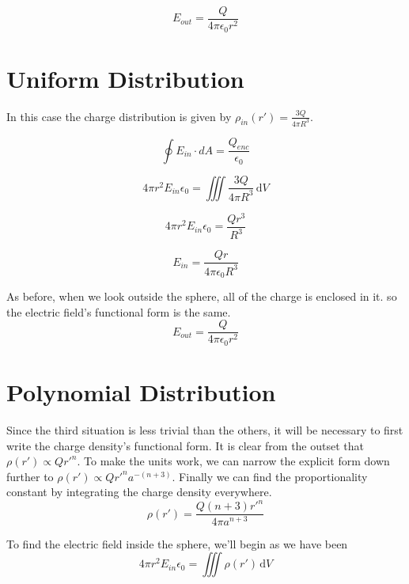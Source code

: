 \documentclass[10pt,a4paper]{article}
\begin{document}
\begin{equation}\boxed{
E_{out} = \frac{Q}{4\pi\epsilon_0 r^2}
}\end{equation}

\section{Uniform Distribution}

In this case the charge distribution is given by $\rho_{in}(r')=\frac{3Q}{4\pi R^3}$.

\begin{equation}
\oint E_{in}\cdot dA=\frac{Q_{enc}}{\epsilon_0}
\end{equation}

\begin{equation}
4\pi r^2 E_{in} \epsilon_0=\iiint \frac{3Q}{4\pi R^3} \,\mathrm{d}V
\end{equation}

\begin{equation}
4\pi r^2 E_{in} \epsilon_0=\frac{Qr^3}{R^3}
\end{equation}

\begin{equation}\boxed{
E_{in}=\frac{Qr}{4\pi \epsilon_0 R^3}
}\end{equation}

As before, when we look outside the sphere, all of the charge is enclosed in it. so the electric field's functional form is the same.
\begin{equation}\boxed{
E_{out} = \frac{Q}{4\pi\epsilon_0 r^2}
}\end{equation}

\section{Polynomial Distribution}
Since the third situation is less trivial than the others, it will be necessary to first write the charge density's functional form. It is clear from the outset that $\rho(r')\propto Qr'^n$. To make the units work, we can narrow the explicit form down further to $\rho(r')\propto Qr'^na^{-(n+3)}$. Finally we can find the proportionality constant by integrating the charge density everywhere.
\begin{equation}
\rho(r')=\frac{Q(n+3)r'^n}{4\pi a^{n+3}}
\end{equation}

To find the electric field inside the sphere, we'll begin as we have been
\begin{equation}
4\pi r^2 E_{in} \epsilon_0 = \iiint \rho(r')\,\mathrm{d}V
\end{equation}
\end{document}
